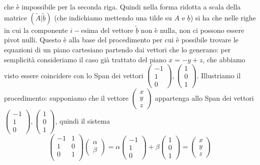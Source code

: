 che è impossibile per la seconda riga. Quindi nella forma ridotta a scala della matrice $(\tilde{A} | \tilde{\underline{b}})$ (che indichiamo mettendo una tilde su $A$ e $\underline{b}$) si ha che nelle righe in cui la componente $i-$esima del vettore $\tilde{\underline{b}}$ non è nulla, non ci possono essere pivot nulli. Questo è alla base del procedimento per cui è possibile trovare le equazioni di un piano cartesiano partendo dai vettori che lo generano: per semplicità consideriamo il caso già trattato del piano $x = -y + z$, che abbiamo visto essere coincidere con lo Span dei vettori
$\begin{pmatrix} -1 \\ 1 \\ 0 \end{pmatrix}, \begin{pmatrix} 1 \\ 0 \\ 1 \end{pmatrix}$. Illustriamo il procedimento: supponiamo che il vettore $\begin{pmatrix} x \\ y \\ z \end{pmatrix}$ appartenga allo Span dei vettori $\begin{pmatrix} -1 \\ 1 \\ 0 \end{pmatrix}, \begin{pmatrix} 1 \\ 0 \\ 1 \end{pmatrix}$,
quindi il sistema
$$
  \begin{pmatrix}
  -1 & 1 \\
  1 & 0 \\
  0 & 1 \\
  \end{pmatrix} \begin{pmatrix}
    \alpha \\
    \beta
  \end{pmatrix} = \alpha \begin{pmatrix} -1 \\ 1 \\ 0 \end{pmatrix} + \beta \begin{pmatrix} 1 \\ 0 \\ 1 \end{pmatrix} = \begin{pmatrix}
    x \\
    y \\
    z
  \end{pmatrix}
$$
